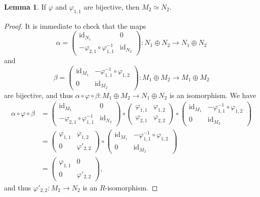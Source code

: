 \documentclass[12pt,a4paper]{report}
\theoremstyle{definition}
\newtheorem{lemma}[theorem]{Lemma}
\theoremstyle{num.custom-title}
\DeclareMathOperator{\id}{id}
\renewcommand{\phi}{\varphi}
\begin{document}
\begin{lemma}\label{lemma_maps_entries}
If $\phi$ and $\phi_{1,1}$ are bijective, then $M_2 \simeq N_2$.
\begin{proof}
It is immediate to check that the maps
\[
\alpha =
\begin{pmatrix}
\id_{N_1} & 0 \\
-\phi_{2,1} \circ \phi_{1,1}^{-1} & \id_{N_2}
\end{pmatrix}
\colon N_1 \oplus N_2 \to N_1 \oplus N_2
\]
and
\[
\beta =
\begin{pmatrix}
\id_{M_1} & -\phi_{1,1}^{-1} \circ \phi_{1,2} \\
0 & \id_{M_2}
\end{pmatrix}
\colon M_1 \oplus M_2 \to M_1 \oplus M_2
\]
are bijective, and thus $\alpha \circ \phi \circ \beta : M_1 \oplus M_2 \to N_1 \oplus N_2$ is an isomorphism. We have
\begin{align*}
\alpha \circ \phi \circ \beta 
&=
\begin{pmatrix}
\id_{M_1} & 0 \\
-\phi_{2,1} \circ \phi_{1,1}^{-1} & \id_{N_2}
\end{pmatrix}
\circ
\begin{pmatrix}
\phi_{1,1} & \phi_{1,2} \\
\phi_{2,1} & \phi_{2,2}
\end{pmatrix}
\circ 
\begin{pmatrix}
\id_{M_1} & -\phi_{1,1}^{-1} \circ \phi_{1,2} \\
0 & \id_{M_2}
\end{pmatrix} \\
&=
\begin{pmatrix}
\phi_{1,1} & \phi_{1,2} \\
0 & \phi'_{2,2}
\end{pmatrix}
\circ 
\begin{pmatrix}
\id_{M_1} & -\phi_{1,1}^{-1} \circ \phi_{1,2} \\
0 & \id_{M_2}
\end{pmatrix} \\
&=
\begin{pmatrix}
\phi_{1,1} & 0 \\
0 & \phi'_{2,2}
\end{pmatrix},
\end{align*}
and thus $\phi'_{2,2} : M_2 \to N_2$ is an $R$-isomorphism.
\end{proof}
\end{lemma}
\end{document}
